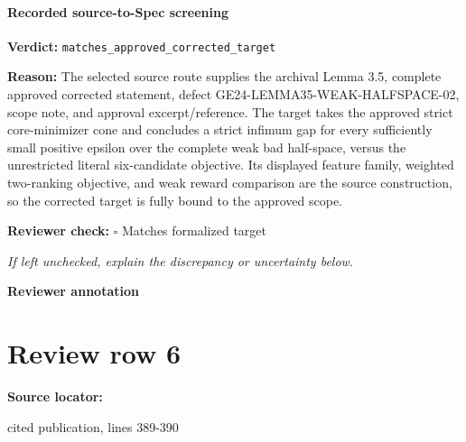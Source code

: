 \documentclass[10pt]{article}
\newcommand{\reviewerbox}{%
  \par\noindent\fbox{\parbox{0.96\linewidth}{\rule{0pt}{0.38in}}}\par
}
\newcommand{\reviewmatch}[1]{%
  \par\noindent\textbf{Reviewer check:} $\square$\; #1\par
  \noindent\emph{If left unchecked, explain the discrepancy or uncertainty below.}\par
}
\begin{document}
\paragraph{Recorded source-to-Spec screening}
\textbf{Verdict:} \texttt{matches\_approved\_corrected\_target}
\\
{\raggedright
\textbf{Reason:} The selected source route supplies the archival Lemma 3.\allowbreak{}5, complete approved corrected statement, defect GE24-\allowbreak{}LEMMA35-\allowbreak{}WEAK-\allowbreak{}HALFSPACE-\allowbreak{}02, scope note, and approval excerpt/\allowbreak{}reference.\allowbreak{}  The target takes the approved strict core-\allowbreak{}minimizer cone and concludes a strict infimum gap for every sufficiently small positive epsilon over the complete weak bad half-\allowbreak{}space, versus the unrestricted literal six-\allowbreak{}candidate objective.\allowbreak{}  Its displayed feature family, weighted two-\allowbreak{}ranking objective, and weak reward comparison are the source construction, so the corrected target is fully bound to the approved scope.\allowbreak{}
\par}
\reviewmatch{Matches formalized target}
\noindent\textbf{Reviewer annotation}\par
\reviewerbox
\clearpage
\hypertarget{source-claim-bbe7cd3338235aa4}{}
\section*{Review row 6}
\textbf{Source locator:} {\footnotesize\raggedright cited publication, lines 389-\allowbreak{}390\par}
\end{document}

